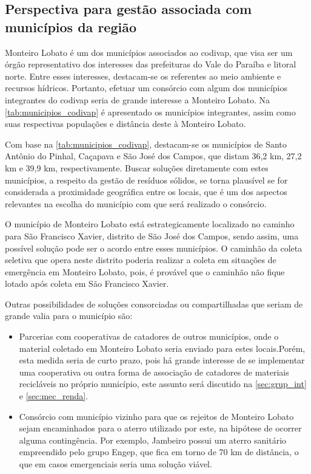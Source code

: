\subsection{Perspectiva para gestão associada com municípios da região}

Monteiro Lobato é um dos municípios associados ao \gls{codivap}, que visa ser um órgão representativo dos interesses das prefeituras do Vale do Paraíba e litoral norte. Entre esses interesses, destacam-se os referentes ao meio ambiente e recursos hídricos. Portanto, efetuar um consórcio com algum dos municípios integrantes do \gls{codivap} seria de grande interesse a Monteiro Lobato. Na \autoref{tab:municipios_codivap} é apresentado os municípios integrantes, assim como suas respectivas populações e distância deste à Monteiro Lobato.


\FloatBarrier

Com base na \autoref{tab:municipios_codivap}, destacam-se os municípios de Santo Antônio do Pinhal, Caçapava e São José dos Campos, que distam 36,2 km, 27,2 km e 39,9 km, respectivamente. Buscar soluções diretamente com estes municípios, a respeito da gestão de resíduos sólidos, se torna plausível se for considerada a proximidade geográfica entre os locais, que é um dos aspectos relevantes na escolha do município com que será realizado o consórcio.

O município de Monteiro Lobato está estrategicamente localizado no caminho para São Francisco Xavier, distrito de São José dos Campos, sendo assim, uma possível solução pode ser o acordo entre esses municípios. O caminhão da coleta seletiva que opera neste distrito poderia realizar a coleta em situações de emergência em Monteiro Lobato, pois, é provável que o caminhão não fique lotado após coleta em São Francisco Xavier.

Outras possibilidades de soluções consorciadas ou compartilhadas que seriam de grande valia para o município são: 
\begin{itemize}
	\item Parcerias com cooperativas de catadores de outros municípios, onde o material coletado em Monteiro Lobato seria enviado para estes locais.Porém, esta medida seria de curto prazo, pois há grande interesse de se implementar uma cooperativa ou outra forma de associação de catadores de materiais recicláveis no próprio município, este assunto será discutido na \autoref{sec:grup_int} e \autoref{sec:mec_renda}.
	
	\item Consórcio com município vizinho para que os rejeitos de Monteiro Lobato sejam encaminhados para o aterro utilizado por este, na hipótese de ocorrer alguma contingência. Por exemplo, Jambeiro possui um aterro sanitário empreendido pelo grupo Engep, que fica em torno de 70 km de distância, o que em casos emergenciais seria uma solução viável.
	
\end{itemize}



